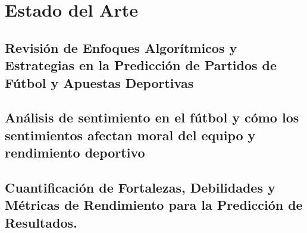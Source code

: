 \section{Estado del Arte}

\subsection{Revisión de Enfoques Algorítmicos y Estrategias en la Predicción de Partidos de Fútbol y Apuestas Deportivas}



\subsection{Análisis de sentimiento en el fútbol y cómo los sentimientos afectan moral del equipo y rendimiento deportivo}



\subsection{Cuantificación de Fortalezas, Debilidades y Métricas de Rendimiento para la Predicción de Resultados.}


